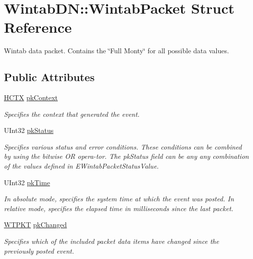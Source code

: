 \hypertarget{struct_wintab_d_n_1_1_wintab_packet}{
\section{WintabDN::WintabPacket Struct Reference}
\label{struct_wintab_d_n_1_1_wintab_packet}
}


Wintab data packet. Contains the \char`\"{}Full Monty\char`\"{} for all possible data values.  


\subsection*{Public Attributes}
\begin{DoxyCompactItemize}
\item 
\hyperlink{class_wintab_d_n_1_1_h_c_t_x}{HCTX} \hyperlink{struct_wintab_d_n_1_1_wintab_packet_a8e32af4bfcc46357c69ac501b756ac38}{pkContext}
\begin{DoxyCompactList}\small\item\em Specifies the context that generated the event. \item\end{DoxyCompactList}\item 
UInt32 \hyperlink{struct_wintab_d_n_1_1_wintab_packet_a2f16f395c9f61bd40038a1029ec62912}{pkStatus}
\begin{DoxyCompactList}\small\item\em Specifies various status and error conditions. These conditions can be combined by using the bitwise OR opera-\/tor. The pkStatus field can be any any combination of the values defined in EWintabPacketStatusValue. \item\end{DoxyCompactList}\item 
UInt32 \hyperlink{struct_wintab_d_n_1_1_wintab_packet_a4e655a9a5378d55d47a3e275e4e68093}{pkTime}
\begin{DoxyCompactList}\small\item\em In absolute mode, specifies the system time at which the event was posted. In relative mode, specifies the elapsed time in milliseconds since the last packet. \item\end{DoxyCompactList}\item 
\hyperlink{class_wintab_d_n_1_1_w_t_p_k_t}{WTPKT} \hyperlink{struct_wintab_d_n_1_1_wintab_packet_a5a6a3eaeed23e1898551cb42267a7167}{pkChanged}
\begin{DoxyCompactList}\small\item\em Specifies which of the included packet data items have changed since the previously posted event. \item\end{DoxyCompactList}\item 

\end{DoxyCompactItemize}
